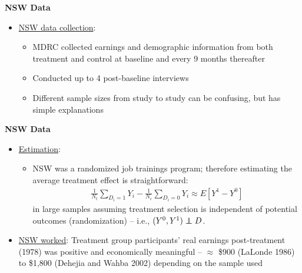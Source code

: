 \documentclass[notes=show]{beamer}
\newcommand\independent{\protect\mathpalette{\protect\independenT}{\perp}}
\def\independenT#1#2{\mathrel{\rlap{$#1#2$}\mkern2mu{#1#2}}}
\begin{document}
\begin{frame}[plain]
	\begin{center}
	\textbf{NSW Data}
	\end{center}
	
	\begin{itemize}
	\item \underline{NSW data collection}:
		\begin{itemize}
		\item MDRC collected earnings and demographic information from both treatment and control at baseline and every 9 months thereafter
		\item Conducted up to 4 post-baseline interviews
		\item Different sample sizes from study to study can be confusing, but has simple explanations
		\end{itemize}
	\end{itemize}
\end{frame}
	

\begin{frame}[plain]
\begin{center}
\textbf{NSW Data}
\end{center}

\begin{itemize}
	\item \underline{Estimation}:
		\begin{itemize}
		\item NSW was a randomized job trainings program; therefore estimating the average treatment effect is straightforward:
			\begin{eqnarray*}
			\frac{1}{N_t}\sum_{D_i=1}Y_i - \frac{1}{N_c}\sum_{D_i=0}Y_i \approx E[Y^1-Y^0] 
			\end{eqnarray*}in large samples assuming treatment selection is independent of potential outcomes (randomization) -- i.e., $(Y^0,Y^1)\independent{D}$. 
		\end{itemize}
	\item \underline{NSW worked}: Treatment group participants' real earnings post-treatment (1978) was positive and economically meaningful -- $\approx$ \$900 (LaLonde 1986) to \$1,800 (Dehejia and Wahba 2002) depending on the sample used
\end{itemize}

\end{frame}
	
\end{document}
